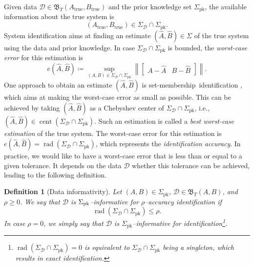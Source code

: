 \documentclass[journal,twoside,web]{ieeecolor}
\DeclareMathOperator{\rad}{rad}
\DeclareMathOperator{\cent}{cent}
\newcommand{\norm}[1]{\left\|#1\right\|}
\newtheorem{definition}[theorem]{Definition}
\begin{document}
Given data $\mathcal{D}\in\mathfrak{B}_T(A_\text{true},B_\text{true})$ and the prior knowledge set $\Sigma_\text{pk}$, the available information about the true system is
\begin{equation}
(A_\text{true},B_\text{true})\in\Sigma_\mathcal{D}\cap\Sigma_\text{pk}.
\end{equation}
System identification aims at finding an estimate \mbox{$(\hat{A},\hat{B})\in\Sigma$} of the true system using the data and prior knowledge. In case $\Sigma_\mathcal{D}\cap\Sigma_\text{pk}$ is bounded, the \emph{worst-case error} for this estimation is
\begin{equation}
e(\hat{A},\hat{B})\coloneqq\sup_{(A,B)\in\Sigma_\mathcal{D}\cap\Sigma_\text{pk}}\norm{\begin{bmatrix}
A-\hat{A} & B-\hat{B}
\end{bmatrix}}.
\end{equation}
One approach to obtain an estimate $(\hat{A},\hat{B})$ is \mbox{set-membership identification} \cite{milanese1991optimal,li2024learning,shakouri2025chebyshev}, which aims at making the worst-case error as small as possible. This can be achieved by taking $(\hat{A},\hat{B})$ as a Chebyshev center of $\Sigma_\mathcal{D}\cap\Sigma_\text{pk}$, i.e., \mbox{$(\hat{A},\hat{B})\in\cent(\Sigma_\mathcal{D}\cap\Sigma_\text{pk})$}. Such an estimation is called a \emph{best worst-case estimation} of the true system. The worst-case error for this estimation is $e(\hat{A},\hat{B})=\rad(\Sigma_\mathcal{D}\cap\Sigma_\text{pk})$, which represents the \emph{identification accuracy}. In practice, we would like to have a worst-case error that is less than or equal to a given tolerance. It depends on the data $\mathcal{D}$ whether this tolerance can be achieved, leading to the following definition. 


\begin{definition}[Data informativity]
\label{def:inf_rho}
Let $(A,B)\in\Sigma_\text{pk}$, \mbox{$\mathcal{D}\in\mathfrak{B}_T(A,B)$}, and $\rho\geq 0$. We say that $\mathcal{D}$ is \emph{\mbox{$\Sigma_\textup{pk}$--informative} for $\rho$--accuracy identification} if
    \begin{equation}
    \label{eq:rad<rho}
    \rad(\Sigma_\mathcal{D}\cap\Sigma_\text{pk})\leq \rho.
    \end{equation}
In case $\rho=0$, we simply say that $\mathcal{D}$ is $\Sigma_\text{pk}$--\emph{informative for identification}\footnote{$\rad(\Sigma_\mathcal{D}\cap\Sigma_\text{pk})=0$ is equivalent to $\Sigma_\mathcal{D}\cap\Sigma_\text{pk}$ being a singleton, which results in exact identification.}. 
\end{definition}
\end{document}
